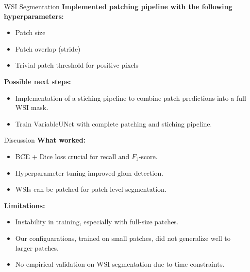 \documentclass{beamer}
\begin{document}
\begin{frame}{WSI Segmentation}
    \textbf{Implemented patching pipeline with the following hyperparameters:}
    \begin{itemize}
        \item Patch size
        \item Patch overlap (stride)
        \item Trivial patch threshold for positive pixels
    \end{itemize}

    \vspace{0.5cm}

    \textbf{Possible next steps:}
    \begin{itemize}
        \item Implementation of a stiching pipeline to combine patch predictions into a full WSI mask.
        \item Train VariableUNet with complete patching and stiching pipeline.
    \end{itemize}
\end{frame}

\begin{frame}{Discussion}
    \textbf{What worked:}
    \begin{itemize}
        \item BCE + Dice loss crucial for recall and $F_1$-score.
        \item Hyperparameter tuning improved glom detection.
        \item WSIs can be patched for patch-level segmentation.
    \end{itemize}

    \vspace{0.5cm}

    \textbf{Limitations:}
    \begin{itemize}
        \item Instability in training, especially with full-size patches.
        \item Our configuarations, trained on small patches, did not generalize well to larger patches.
        \item No empirical validation on WSI segmentation due to time constraints.
    \end{itemize}
\end{frame}
\end{document}
